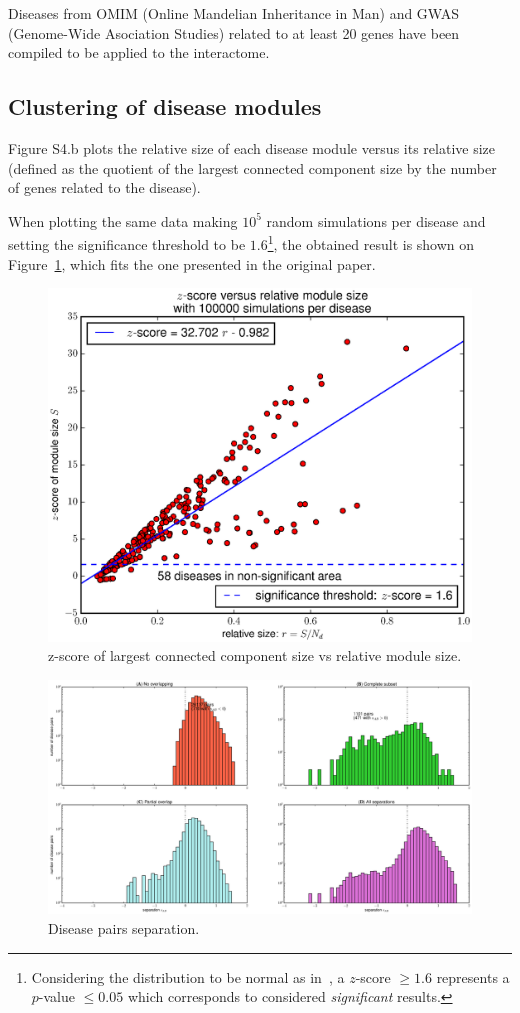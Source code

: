 \documentclass[letterpaper]{article}
\begin{document}
Diseases from OMIM (Online Mandelian Inheritance in Man) and GWAS (Genome-Wide Asociation Studies)
related to at least 20 genes have been compiled to be applied to the interactome.

	\subsection{Clustering of disease modules}\label{subsec:clustering of disease modules}
	Figure S4.b plots the relative size of each disease module versus its relative size (defined as the
	quotient of the largest connected component size by the number of genes related to the disease).

	When plotting the same data making $10^5$ random simulations per disease and setting the significance
	threshold to be $1.6$\footnote{Considering the distribution to be normal as in~\cite{fluctuationGiantComponent},
	a $z$-score $\geq 1.6$ represents a $p$-value $\leq 0.05$ which corresponds to considered
	\textit{significant} results.}, the obtained result is shown on
	Figure~\ref{fig:zscore}, which fits the one presented in the original paper.

	\begin{figure}[!h]
		\includegraphics[width=.5\textwidth]{images/S4.b100000.eps}
		\caption{z-score of largest connected component size vs relative module size.\label{fig:zscore}}
	\end{figure}

	\begin{figure}[!t]
		\hspace{-1.8cm}
		\includegraphics[scale=.35]{images/s_AB_histograms.eps}
		\caption{Disease pairs separation.\label{fig:s_AB histogram}}
	\end{figure}
\end{document}
